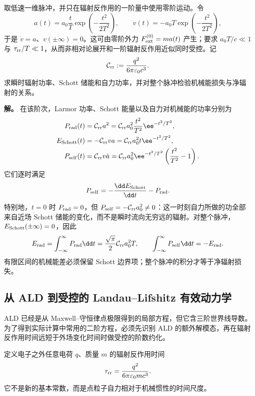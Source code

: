 \begin{exbox}
取低速一维脉冲，并只在辐射反作用的一阶量中使用零阶运动。令
\[
 a(t)=a_0\frac{t}{T}\exp\!\left(-\frac{t^2}{2T^2}\right),
 \qquad
 v(t)=-a_0T\exp\!\left(-\frac{t^2}{2T^2}\right),
\]
于是 \(\dot v=a\)、\(v(\pm\infty)=0\)。这可由零阶外力 \(F_{\rm ext}^{(0)}=ma(t)\) 产生；要求 \(a_0T/c\ll1\) 与 \(\tau_{\rm rr}/T\ll1\)，从而非相对论展开和一阶辐射反作用近似同时受控。记
\[
 \mathcal C_{\rm rr}:=\frac{q^2}{6\pi\varepsilon_0c^3}.
\]
求瞬时辐射功率、Schott 储能和自力功率，并对整个脉冲检验机械能损失与净辐射的关系。

\textbf{解。} 在该阶次，Larmor 功率、Schott 能量以及自力对机械能的功率分别为
\begin{align*}
 P_{\rm rad}(t)
 &=\mathcal C_{\rm rr} a^2
 =\mathcal C_{\rm rr} a_0^2\frac{t^2}{T^2}\ee^{-t^2/T^2},\\
 E_{\rm Schott}(t)
 &=-\mathcal C_{\rm rr}va
 =\mathcal C_{\rm rr} a_0^2t \ee^{-t^2/T^2},\\
 P_{\rm self}(t)
 &=\mathcal C_{\rm rr} v\dot a
 =\mathcal C_{\rm rr} a_0^2\ee^{-t^2/T^2}
 \left(\frac{t^2}{T^2}-1\right).
\end{align*}
它们逐时满足
\[
 P_{\rm self}
 =-\frac{\dd E_{\rm Schott}}{\dd t}-P_{\rm rad}.
\]
特别地，\(t=0\) 时 \(P_{\rm rad}=0\)，但 \(P_{\rm self}=-\mathcal C_{\rm rr}a_0^2\neq0\)：这一时刻自力所做的功全部来自近场 Schott 储能的变化，而不是瞬时流向无穷远的辐射。对整个脉冲，\(E_{\rm Schott}(\pm\infty)=0\)，因此
\[
 E_{\rm rad}
 =\int_{-\infty}^{\infty}P_{\rm rad}\dd t
 =\frac{\sqrt\pi}{2}\mathcal C_{\rm rr}a_0^2T,
 \qquad
 \int_{-\infty}^{\infty}P_{\rm self}\dd t=-E_{\rm rad}.
\]
有限区间的机械能差必须保留 Schott 边界项；整个脉冲的积分才等于净辐射损失。


\end{exbox}

\subsection{从 ALD 到受控的 Landau--Lifshitz 有效动力学}

ALD 已经是从 Maxwell--守恒律点极限得到的局部方程，但它含三阶世界线导数。为了得到实际计算中常用的二阶方程，必须先识别 ALD 的额外解模态，再在辐射反作用时间远短于外场变化时间时做受控的阶数约化。

定义电子之外任意电荷 \(q\)、质量 \(m\) 的辐射反作用时间
\begin{equation}
 \tau_{\rm rr}=\frac{q^2}{6\pi\varepsilon_0mc^3}.
 \label{eq:phys-rr-reaction-time}
\end{equation}
它不是新的基本常数，而是点粒子自力相对于机械惯性的时间尺度。

